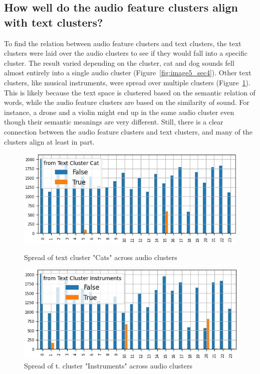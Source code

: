 \subsection{How well do the audio feature clusters align with text clusters?}
\label{sec:Text Features:c}


To find the relation between audio feature clusters and text clusters, the text clusters were laid over the audio clusters to see if they would fall into a specific cluster. The result varied depending on the cluster, cat and dog sounds fell almost entirely into a single audio cluster (Figure~\ref{fig:image5_sec4}). Other text clusters, like musical instruments, were spread over multiple clusters (Figure~\ref{fig:image6_sec4}).\\
This is likely because the text space is clustered based on the semantic relation of words, while the audio feature clusters are based on the similarity of sound. For instance, a drone and a violin might end up in the same audio cluster even though their semantic meanings are very different. 
Still, there is a clear connection between the audio feature clusters and text clusters, and many of the clusters align at least in part.

\begin{figure}[ht]
  \centering
  \begin{minipage}[b]{0.49\textwidth}
    \centering
    \includegraphics[width=\textwidth]{figs/cat_test_cluster_over_audio_cluster.jpg}
    \caption{Spread of text cluster "Cats" across audio clusters}
    \label{fig:image5_sec4}
  \end{minipage}
  \hfill
  \begin{minipage}[b]{0.49\textwidth}
    \centering
    \includegraphics[width=\textwidth]{figs/instruments_test_cluster_over_audio_cluster.jpg}
    \caption{Spread of t. cluster "Instruments" across audio clusters}
    \label{fig:image6_sec4}
  \end{minipage}
 \end{figure}



